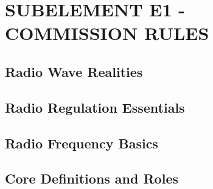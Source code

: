 \documentclass[12pt]{book}
\begin{document}
\tableofcontents
\newpage
\chapter{SUBELEMENT E1 - COMMISSION RULES}
\section{Radio Wave Realities}











\section{Radio Regulation Essentials}











\section{Radio Frequency Basics}












\section{Core Definitions and Roles}












\end{document}
